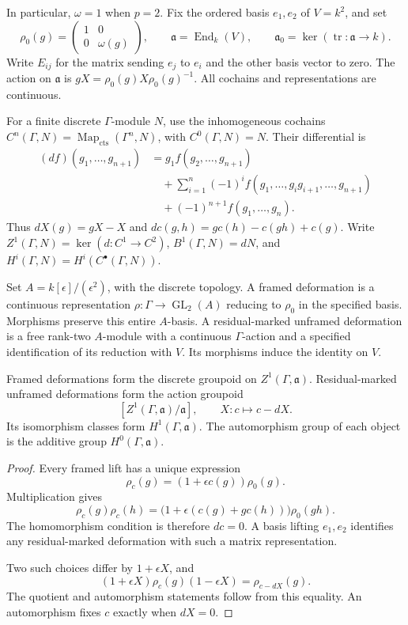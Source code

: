 In particular, \(\omega=1\) when \(p=2\).
Fix the ordered basis \(e_1,e_2\) of \(V=k^2\), and set
\[
 \rho_0(g)=\begin{pmatrix}1&0\\0&\omega(g)\end{pmatrix},\qquad
 \mathfrak a=\operatorname{End}_k(V),\qquad
 \mathfrak a_0=\ker(\operatorname{tr}:\mathfrak a\to k).
\]
Write \(E_{ij}\) for the matrix sending \(e_j\) to \(e_i\) and the other basis vector to zero.
The action on \(\mathfrak a\) is \(gX=\rho_0(g)X\rho_0(g)^{-1}\).
All cochains and representations are continuous.

For a finite discrete \(\Gamma\)-module \(N\), use the inhomogeneous cochains
\(C^n(\Gamma,N)=\operatorname{Map}_{\mathrm{cts}}(\Gamma^n,N)\), with \(C^0(\Gamma,N)=N\).
Their differential is
\begin{align*}
 (df)(g_1,\ldots,g_{n+1})
 &=g_1f(g_2,\ldots,g_{n+1})\\
 &\quad+\sum_{i=1}^n(-1)^i
 f(g_1,\ldots,g_ig_{i+1},\ldots,g_{n+1})\\
 &\quad+(-1)^{n+1}f(g_1,\ldots,g_n).
\end{align*}
Thus \(dX(g)=gX-X\) and
\(dc(g,h)=gc(h)-c(gh)+c(g)\).
Write \(Z^1(\Gamma,N)=\ker(d:C^1\to C^2)\),
\(B^1(\Gamma,N)=dN\), and \(H^i(\Gamma,N)=H^i(C^\bullet(\Gamma,N))\).

Set \(A=k[\epsilon]/(\epsilon^2)\), with the discrete topology.
A framed deformation is a continuous representation
\(\rho:\Gamma\to\operatorname{GL}_2(A)\) reducing to \(\rho_0\) in the specified basis.
Morphisms preserve this entire \(A\)-basis.
A residual-marked unframed deformation is a free rank-two \(A\)-module
with a continuous \(\Gamma\)-action and a specified identification of its
reduction with \(V\). Its morphisms induce the identity on \(V\).

\begin{proposition}
\label{v4-arith:ic:local-cyclotomic:groupoids}
Framed deformations form the discrete groupoid on \(Z^1(\Gamma,\mathfrak a)\).
Residual-marked unframed deformations form the action groupoid
\[
 [Z^1(\Gamma,\mathfrak a)/\mathfrak a],\qquad
 X:c\longmapsto c-dX.
\]
Its isomorphism classes form \(H^1(\Gamma,\mathfrak a)\).
The automorphism group of each object is the additive group
\(H^0(\Gamma,\mathfrak a)\).
\end{proposition}

\begin{proof}
Every framed lift has a unique expression
\[
 \rho_c(g)=(1+\epsilon c(g))\rho_0(g).
\]
Multiplication gives
\[
 \rho_c(g)\rho_c(h)
 =\bigl(1+\epsilon(c(g)+gc(h))\bigr)\rho_0(gh).
\]
The homomorphism condition is therefore \(dc=0\).
A basis lifting \(e_1,e_2\) identifies any residual-marked deformation
with such a matrix representation.

Two such choices differ by
\(1+\epsilon X\), and
\[
 (1+\epsilon X)\rho_c(g)(1-\epsilon X)=\rho_{c-dX}(g).
\]
The quotient and automorphism statements follow from this equality.
An automorphism fixes \(c\) exactly when \(dX=0\).
\end{proof}

